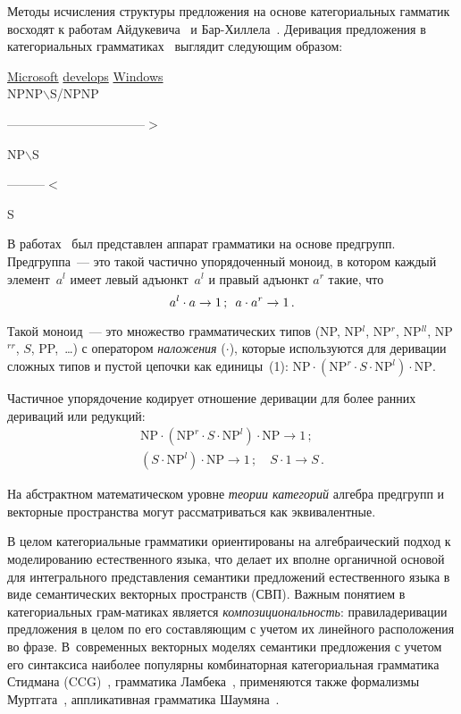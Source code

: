 \begin{multicols}{2}
  Методы исчисления структуры предложения на основе категориальных 
гамматик восходят к работам Айдукевича~\cite{20-koz} и 
Бар-Хил\-ле\-ла~\cite{21-koz}. Деривация предложения в 
категориальных грамматиках~\cite{23-koz, 22-koz} выглядит следующим 
образом:
  \begin{center}
\underline{Microsoft} \underline{develops} 
\underline{Windows}\\[6pt]

   NP\quad     NP$\backslash$S/NP\quad   NP

---------------------------------$>$

NP$\backslash$S

---------$<$

S
\end{center}

  В работах~\cite{23-koz, 24-koz} был представлен аппарат грамматики на 
основе предгрупп. Предгруппа~--- это такой частично упорядоченный 
моноид, в котором каждый элемент~$a^l$ имеет левый адъюнкт~$a^l$ и 
правый адъюнкт $a^r$ такие, что 
  $$
  a^l\cdot a\to 1\,;\enskip a\cdot a^r\to 1\,.
  $$
  
  Такой моноид~--- это множество грамматических типов (NP, NP$^l$, 
NP$^r$, NP$^{ll}$, NP$^{rr}$, $S$, PP,\ \ldots) с оператором \textit{наложения} 
($\cdot$), которые используются для деривации сложных типов и пустой 
цепочки как единицы~(1):
  $\mathrm{NP}\cdot (\mathrm{NP}^r\cdot {S}\cdot  \mathrm{NP}^l)\cdot \mathrm{NP}$.
  
  Частичное упорядочение кодирует отношение деривации для более ранних 
дериваций или редукций:
  \begin{gather*}
     \mathrm{NP}\cdot  (\mathrm{NP}^r\cdot {S} \cdot \mathrm{NP}^l)\cdot \mathrm{NP} \to 1\,;\\
      ({S}\cdot \mathrm{NP}^l)\cdot \mathrm{NP}\to  1\,;\quad {S}\cdot 1\to {S}\,.
     \end{gather*}
     
  На абстрактном математическом уровне \textit{теории категорий} алгебра 
предгрупп и векторные пространства могут рассматриваться как 
эквивалентные.
  
  В целом категориальные грамматики ориентированы на алгебраический 
подход к моделированию естественного языка, что делает их вполне 
органич\-ной основой для интегрального пред\-став\-ле\-ния семантики 
предложений естественного языка в виде семантических векторных 
пространств (СВП). Важным понятием в категориальных грам-\linebreak матиках является 
\textit{композициональность}: правила\linebreak деривации предложения в целом по 
его со\-став\-ля\-ющим с учетом их линейного расположения во фразе. 
В~современных векторных моделях семантики предложения с учетом его 
синтаксиса наиболее популярны комбинаторная категориальная грамматика 
Стидмана (CCG)~\cite{22-koz}, грамматика 
Ламбека~\cite{23-koz, 24-koz}, применяются также формализмы 
Муртгата~\cite{25-koz}, аппликативная грамматика 
Шаумяна~\cite{3-koz}.
  

\end{multicols}
